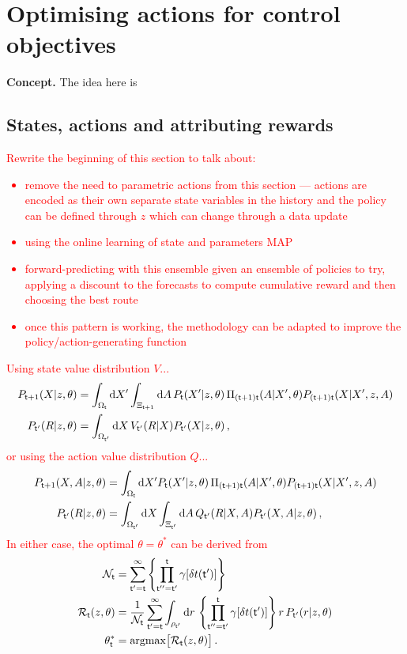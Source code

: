 \chapter{\sffamily Optimising actions for control objectives}

{\bfseries\sffamily Concept.} The idea here is 

\section{\sffamily States, actions and attributing rewards}

\textcolor{red}{Rewrite the beginning of this section to talk about:
\begin{itemize}
\item{remove the need to parametric actions from this section --- actions are encoded as their own separate state variables in the history and the policy can be defined through $z$ which can change through a data update}
\item{using the online learning of state and parameters MAP}
\item{forward-predicting with this ensemble given an ensemble of policies to try, applying a discount to the forecasts to compute cumulative reward and then choosing the best route}
\item{once this pattern is working, the methodology can be adapted to improve the policy/action-generating function}    
\end{itemize}
Using state value distribution $V$...
\begin{align}
P_{{\sf t}+1}(X\vert z,\theta ) &= \int_{\Omega_{{\sf t}}}{\rm d}X' \int_{\Xi_{{\sf t}+1}}{\rm d}A \, P_{{\sf t}}(X'\vert z,\theta ) \, \Pi_{({\sf t}+1){\sf t}}(A\vert X',\theta)P_{({\sf t}+1){\sf t}}(X\vert X',z,A)  \\
P_{{\sf t}'}(R\vert z,\theta ) &= \int_{\Omega_{{\sf t}'}} {\rm d}X \, V_{{\sf t}'}(R\vert X)P_{{\sf t}'}(X\vert z,\theta ) \,,
\end{align}
or using the action value distribution $Q$...
\begin{align}
P_{{\sf t}+1}(X,A\vert z,\theta ) &= \int_{\Omega_{{\sf t}}}{\rm d}X' P_{{\sf t}}(X'\vert z,\theta ) \, \Pi_{({\sf t}+1){\sf t}}(A\vert X',\theta)P_{({\sf t}+1){\sf t}}(X\vert X',z,A) \\
P_{{\sf t}'}(R\vert z,\theta ) &= \int_{\Omega_{{\sf t}'}} {\rm d}X \int_{\Xi_{{\sf t}'}}{\rm d}A \, Q_{{\sf t}'}(R\vert X,A)P_{{\sf t}'}(X,A\vert z,\theta ) \,,
\end{align}
In either case, the optimal $\theta = \theta^*$ can be derived from
\begin{align}
{\cal N}_{{\sf t}} &= \sum_{{\sf t}'={\sf t}}^{\infty}\left\{ \prod_{{\sf t}''={\sf t}'}^{{\sf t}} \gamma [\delta t({\sf t}')] \right\} \\
{\cal R}_{{\sf t}}(z,\theta ) &= \frac{1}{{\cal N}_{{\sf t}}}\sum_{{\sf t}'={\sf t}}^{\infty}\int_{\rho_{{\sf t}'}} {\rm d}r \,\left\{ \prod_{{\sf t}''={\sf t}'}^{{\sf t}} \gamma [\delta t({\sf t}')] \right\} r \,P_{{\sf t}'}(r\vert z,\theta ) \\
\theta^*_{{\sf t}} &= {\rm argmax} \big[ {\cal R}_{{\sf t}}(z,\theta )\big] \,.
\end{align}
}

